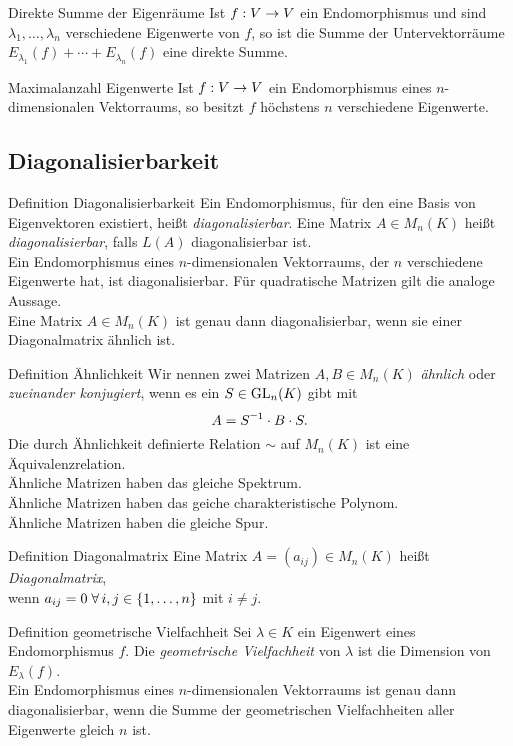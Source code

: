 \documentclass[main.tex]{subfiles}
\begin{document}
\begin{karte}{Direkte Summe der Eigenräume}
    Ist \( f : V \rightarrow V \) ein Endomorphismus und sind 
    \( \lambda_1,\ldots,\lambda_n \) verschiedene Eigenwerte 
    von \(f\), so ist die Summe der Untervektorräume 
    \( E_{\lambda_1}(f) + \cdots + E_{\lambda_n}(f) \) eine 
    direkte Summe.
\end{karte}
\begin{karte}{Maximalanzahl Eigenwerte}
    Ist \( f : V \rightarrow V \) ein Endomorphismus eines 
    \(n\)-dimensionalen Vektorraums, so besitzt \(f\) 
    höchstens \(n\) verschiedene Eigenwerte.
\end{karte}
\subsection*{Diagonalisierbarkeit}
\begin{karte}{Definition Diagonalisierbarkeit}
    Ein Endomorphismus, für den eine Basis von Eigenvektoren 
    existiert, heißt \textit{diagonalisierbar}. Eine Matrix 
    \( A \in M_n(K) \) heißt \textit{diagonalisierbar}, falls 
    \( L(A) \) diagonalisierbar ist.\\
    Ein Endomorphismus eines \(n\)-dimensionalen Vektorraums, 
    der \(n\) verschiedene Eigenwerte hat, ist diagonalisierbar. 
    Für quadratische Matrizen gilt die analoge Aussage.\\
    Eine Matrix \( A \in M_n(K) \) ist genau dann diagonalisierbar, 
    wenn sie einer Diagonalmatrix ähnlich ist.
\end{karte}
\begin{karte}{Definition Ähnlichkeit}
    Wir nennen zwei Matrizen \( A, B \in M_n(K) \) 
    \textit{ähnlich} oder \textit{zueinander konjugiert}, 
    wenn es ein \( S \in \operatorname{GL}_n(K) \) gibt mit 
    \[ A = \inverse{S} \cdot B \cdot S. \]
    Die durch Ähnlichkeit definierte Relation \( \sim \) 
    auf \( M_n(K) \) ist eine Äquivalenzrelation.\\
    Ähnliche Matrizen haben das gleiche Spektrum.\\
    Ähnliche Matrizen haben das geiche charakteristische Polynom.\\
    Ähnliche Matrizen haben die gleiche Spur.
\end{karte}
\begin{karte}{Definition Diagonalmatrix}
    Eine Matrix \( A = (a_{ij}) \in M_n(K) \) heißt 
    \textit{Diagonalmatrix}, \\
    wenn \( a_{ij} = 0  
    \; \forall i,j \in \set{1,\ldots,n} \) mit \( i \neq j \).
\end{karte}
\begin{karte}{Definition geometrische Vielfachheit}
    Sei \( \lambda \in K \) ein Eigenwert eines Endomorphismus 
    \( f \). Die \textit{geometrische Vielfachheit} von 
    \( \lambda \) ist die Dimension von \( E_\lambda(f) \).\\
    Ein Endomorphismus eines \(n\)-dimensionalen Vektorraums 
    ist genau dann diagonalisierbar, wenn die Summe der 
    geometrischen Vielfachheiten aller Eigenwerte gleich 
    \(n\) ist.
\end{karte}
\end{document}
